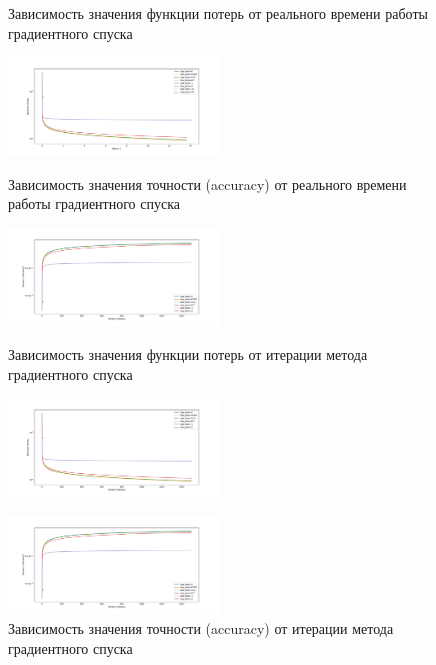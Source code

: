\documentclass[a4paper, 11pt]{article}
\begin{document}
                
                \begin{figure}[H] \label{exp1}
                    \begin{multicols}{2}
                        \begin{center}
                            \caption{Зависимость значения функции потерь от реального времени работы градиентного спуска} \label{exp2:gd_func_time}
                            \includegraphics[width=0.5\textwidth, height=0.25\textheight]{../graphs/exp2_func_GD_beta_time_alpha=1.pdf}
                            
                            \caption{Зависимость значения точности (accuracy) от реального времени работы градиентного спуска} \label{exp2:gd_acc_time}
                            \includegraphics[width=0.5\textwidth, height=0.25\textheight]{../graphs/exp2_accuracy_GD_beta_iteration_alpha=1.pdf}
                            
                            \caption{Зависимость значения функции потерь от итерации метода градиентного спуска} \label{exp2:gd_func_iter}
                            \includegraphics[width=0.5\textwidth, height=0.25\textheight]{../graphs/exp2_func_GD_beta_iteration_alpha=1.pdf}
                            
                            \caption{Зависимость значения точности (accuracy) от итерации метода градиентного спуска} \label{exp2:gd_acc_iter}
                            \includegraphics[width=0.5\textwidth, height=0.25\textheight]{../graphs/exp2_accuracy_GD_beta_iteration_alpha=1.pdf}
                        \end{center}
                    \end{multicols}
                \end{figure}
\end{document}
